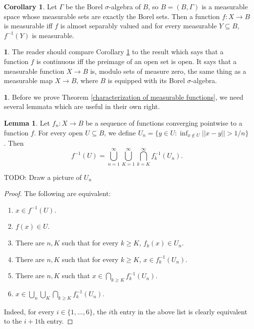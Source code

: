 \documentclass[12pt]{book}
\theoremstyle{definition}
\newtheorem{lemma}[theorem]{Lemma}
\newtheorem{corollary}[theorem]{Corollary}
\newtheorem{subsec}[theorem]{}
\begin{document}
\begin{corollary}
\label{characterization of measurable functions II}
Let $\Gamma$ be the Borel $\sigma$-algebra of $B$, so $B = (B, \Gamma)$ is a measurable space whose measurable sets are exactly the Borel sets.
Then a function $f: X \to B$ is measurable iff $f$ is almost separably valued and for every measurable $Y \subseteq B$, $f^{-1}(Y)$ is measurable.
\end{corollary}

\begin{subsec}
The reader should compare Corollary \ref{characterization of measurable functions II} to the result which says that a function $f$ is continuous iff the preimage of an open set is open. It says that a measurable function $X \to B$ is, modulo sets of measure zero, the same thing as a measurable map $X \to B$, where $B$ is equipped with its Borel $\sigma$-algebra.
\end{subsec}

\begin{subsec}
Before we prove Theorem \ref{characterization of measurable functions}, we need several lemmata which are useful in their own right.
\end{subsec}

\begin{lemma}
\label{Newberger lemma 1}
Let $f_n: X \to B$ be a sequence of functions converging pointwise to a function $f$.
For every open $U \subseteq B$, we define $U_n = \{y \in U: \inf_{x \notin U} ||x - y|| > 1/n\}$.
Then
$$f^{-1}(U) = \bigcup_{n=1}^\infty \bigcup_{K=1}^\infty \bigcap_{k=K}^\infty f_k^{-1}(U_n).$$
\end{lemma}
TODO: Draw a picture of $U_n$
\begin{proof}
The following are equivalent:
\begin{enumerate}
\item $x \in f^{-1}(U)$.
\item $f(x) \in U$.
\item There are $n, K$ such that for every $k \geq K$, $f_k(x) \in U_n$.
\item There are $n, K$ such that for every $k \geq K$, $x \in f_k^{-1}(U_n)$.
\item There are $n, K$ such that $x \in \bigcap_{k \geq K} f_k^{-1}(U_n)$.
\item $x \in \bigcup_n \bigcup_K \bigcap_{k \geq K} f_k^{-1}(U_n)$.
\end{enumerate}
Indeed, for every $i \in \{1, \dots, 6\}$, the $i$th entry in the above list is clearly equivalent to the $i+1$th entry.
\end{proof}
\end{document}

